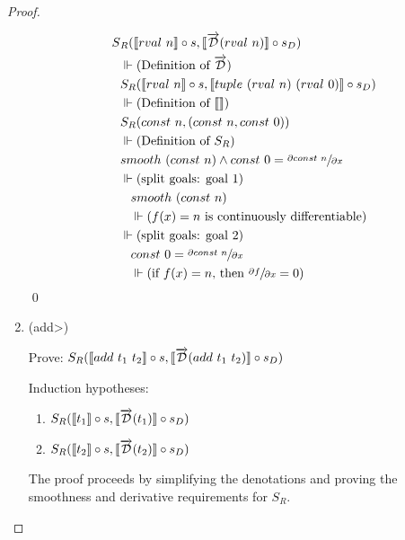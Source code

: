 \documentclass[11pt, final]{article}
\begin{document}
\begin{proof}
\begin{enumerate}
      \begin{align*}
        S&_R(\llbracket rval\ n \rrbracket \circ s, \llbracket \overrightarrow{\mathcal{D}}(rval\ n) \rrbracket \circ s_D) \\
        &\Vdash \text{(Definition of $\overrightarrow{\mathcal{D}}$)}\\
        &S_R(\llbracket rval\ n \rrbracket \circ s, \llbracket tuple\ (rval\ n)\ (rval\ 0) \rrbracket \circ s_D) \\
        &\Vdash \text{(Definition of $\llbracket\rrbracket$)}\\
        &S_R(const\ n, (const\ n, const\ 0)) \\
        &\Vdash \text{(Definition of $S_R$)}\\
        &smooth\ (const\ n) \wedge
          const\ 0 = \sfrac{\partial{const\ n}}{\partial{x}} \\
        &\Vdash \text{(split goals: goal 1)}\\
        &\;\;\;smooth\ (const\ n) \\
        &\;\;\;\Vdash \text{($f(x) = n$ is continuously differentiable)}\\
        &\Vdash \text{(split goals: goal 2)}\\
        &\;\;\;const\ 0 = \sfrac{\partial{const\ n}}{\partial{x}} \\
        &\;\;\;\Vdash \text{(if $f(x) = n$, then $\sfrac{\partial{f}}{\partial{x}} = 0$)}
      \end{align*} \qed
      \item (\<add>)

      Prove: $S_R(\llbracket add\ t_1\ t_2 \rrbracket \circ s, \llbracket \overrightarrow{\mathcal{D}}(add\ t_1\ t_2) \rrbracket \circ s_D)$

      Induction hypotheses:
      \begin{enumerate}
        \item \label{eqn:subst_ih_add1}$S_R(\llbracket t_1 \rrbracket \circ s, \llbracket \overrightarrow{\mathcal{D}}(t_1) \rrbracket \circ s_D)$
        \item \label{eqn:subst_ih_add2}$S_R(\llbracket t_2 \rrbracket \circ s, \llbracket \overrightarrow{\mathcal{D}}(t_2) \rrbracket \circ s_D)$
      \end{enumerate}

      The proof proceeds by simplifying the denotations and proving the smoothness and derivative requirements for $S_R$.


\end{enumerate}
\end{proof}
\end{document}
